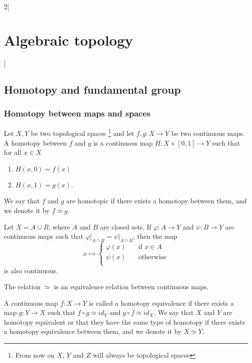\documentclass[../../../main_math.tex]{subfiles}
\begin{document}
\renewcommand{\col}{\geo}
\begin{multicols}{2}[\section{Algebraic topology}]
  \subsection{Homotopy and fundamental group}
  \subsubsection{Homotopy between maps and spaces}

  \begin{definition}
    Let $X,Y$ be two topological spaces \footnote{From now on $X$, $Y$ and $Z$ will always be topological spaces} and let $f,g: X \to Y$ be two continuous maps. A homotopy between $f$ and $g$ is a continuous map $H:X\times [0,1] \to Y$ such that for all $x\in X$
    \begin{enumerate}
      \item $H(x,0)=f(x)$
      \item $H(x,1)=g(x)$.
    \end{enumerate}
    We say that $f$ and $g$ are homotopic if there exists a homotopy between them, and we denote it by $f\simeq g$.
  \end{definition}

  \begin{lemma}
    Let $X=A\cup B$, where $A$ and $B$ are closed sets. If $\varphi: A \to Y$ and $\psi: B \to Y$ are continuous maps such that $\left.\varphi \right|_{A\cap B}=\left.\psi \right|_{A\cap B}$, then the map $$x\mapsto \begin{cases}
        \varphi(x) & \quad\text{if  } x\in A \\
        \psi(x)    & \quad\text{otherwise}   \\
      \end{cases}$$ is also continuous.
  \end{lemma}

  \begin{proposition}
    The relation $\simeq$ is an equivalence relation between continuous maps.
  \end{proposition}

  \begin{definition}
    A continuous map $f:X\to Y$ is called a homotopy equivalence if there exists a map $g:Y\to X$ such that $f\circ g\simeq id_Y$ and $g\circ f \simeq id_X$. We say that $X$ and $Y$ are homotopy equivalent or that they have the same type of homotopy if there exists a homotopy equivalence between them, and we denote it by $X\simeq Y$.
  \end{definition}


\end{multicols}
\end{document}
